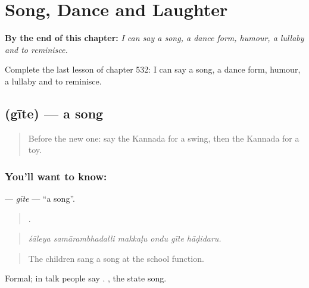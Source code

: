 
\chapter{Song, Dance and Laughter}
\label{ch:ka-song-dance-and-laughter}

\begin{chapteropening}
\textbf{By the end of this chapter:} \emph{I can say a song, a dance form, humour, a lullaby and to reminisce.}

Complete the last lesson of chapter 532: I can say a song, a dance form, humour, a lullaby and to reminisce.
\end{chapteropening}

\section[\texorpdfstring{\kn{ಗೀತೆ} (gīte)}{ಗೀತೆ (gīte)}]{ (gīte) — a song}

\label{lesson:KA-C532-gite}



\begin{quote}
Before the new one: say the Kannada for a swing, then the Kannada for a toy.
\end{quote}

\subsection*{You'll want to know: }
\textbf{} — \emph{gīte} — \textquotedblleft{}a song\textquotedblright{}.

\begin{quote}
     .
\end{quote}

\begin{quote}
\emph{śāleya samārambhadalli makkaḷu ondu gīte hāḍidaru.}
\end{quote}

\begin{quote}
The children sang a song at the school function.
\end{quote}

Formal; in talk people say . , the state song.

